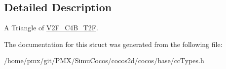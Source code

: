 \subsection{Detailed Description}
A Triangle of \hyperlink{structV2F__C4B__T2F}{V2\+F\+\_\+\+C4\+B\+\_\+\+T2F}. 

The documentation for this struct was generated from the following file\+:\begin{DoxyCompactItemize}
\item 
/home/pmx/git/\+P\+M\+X/\+Simu\+Cocos/cocos2d/cocos/base/cc\+Types.\+h\end{DoxyCompactItemize}
